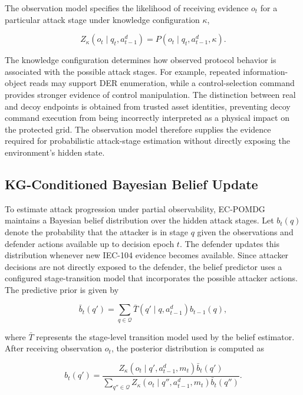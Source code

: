 \documentclass[10pt,conference]{IEEEtran}
\begin{document}
The observation model specifies the likelihood of receiving evidence $o_t$ for a particular attack stage under knowledge configuration $\kappa$,

\begin{equation}
Z_{\kappa}(o_t\mid q_t,a_{t-1}^{d})
=
P(o_t\mid q_t,a_{t-1}^{d},\kappa).
\label{eq:observation_model}
\end{equation}

\noindent
The knowledge configuration determines how observed protocol behavior is associated with the possible attack stages. For example, repeated information-object reads may support DER enumeration, while a control-selection command provides stronger evidence of control manipulation. The distinction between real and decoy endpoints is obtained from trusted asset identities, preventing decoy command execution from being incorrectly interpreted as a physical impact on the protected grid. The observation model therefore supplies the evidence required for probabilistic attack-stage estimation without directly exposing the environment's hidden state.

\subsection{KG-Conditioned Bayesian Belief Update}

To estimate attack progression under partial observability, EC-POMDG maintains a Bayesian belief distribution over the hidden attack stages. Let $b_t(q)$ denote the probability that the attacker is in stage $q$ given the observations and defender actions available up to decision epoch $t$. The defender updates this distribution whenever new IEC-104 evidence becomes available. Since attacker decisions are not directly exposed to the defender, the belief predictor uses a configured stage-transition model that incorporates the possible attacker actions. The predictive prior is given by

\begin{equation}
\bar{b}_t(q') =
\sum_{q\in\mathcal{Q}}
\bar{T}(q'\mid q,a_{t-1}^{d})b_{t-1}(q),
\label{eq:belief_prediction}
\end{equation}

\noindent
where $\bar{T}$ represents the stage-level transition model used by the belief estimator. After receiving observation $o_t$, the posterior distribution is computed as

\begin{equation}
b_t(q') =
\frac{
Z_{\kappa}(o_t\mid q',a_{t-1}^{d},m_t)
\bar{b}_t(q')
}{
\displaystyle\sum_{q''\in\mathcal{Q}}
Z_{\kappa}(o_t\mid q'',a_{t-1}^{d},m_t)
\bar{b}_t(q'')
}.
\label{eq:bayesian_belief_update}
\end{equation}
\end{document}

